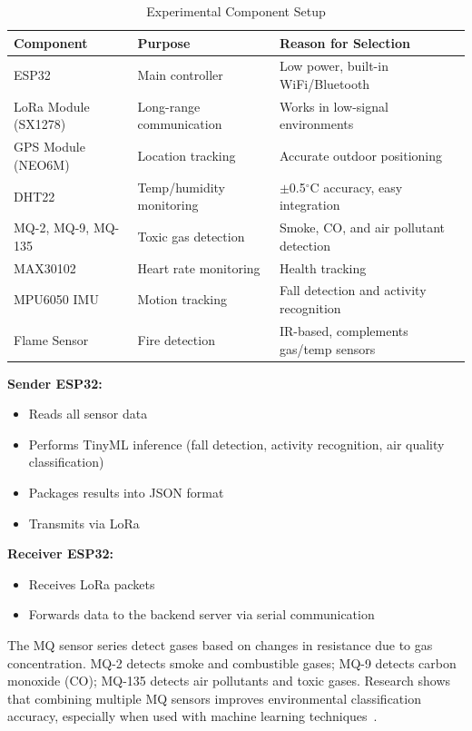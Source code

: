 \documentclass[conference]{IEEEtran}
\begin{document}
	\begin{table}[h]
		\caption{Experimental Component Setup}
		\label{tab:components}
		\centering
		\renewcommand{\arraystretch}{1.2}
		\begin{tabular}{|p{2.2cm}|p{2.4cm}|p{2.8cm}|}
			\hline
			\textbf{Component} & \textbf{Purpose} & \textbf{Reason for Selection} \\
			\hline
			ESP32 & Main controller & Low power, built-in WiFi/Bluetooth \\
			\hline
			LoRa Module (SX1278) & Long-range communication & Works in low-signal environments \\
			\hline
			GPS Module (NEO6M) & Location tracking & Accurate outdoor positioning \\
			\hline
			DHT22 & Temp/humidity monitoring & $\pm$0.5$^\circ$C accuracy, easy integration \\
			\hline
			MQ-2, MQ-9, MQ-135 & Toxic gas detection & Smoke, CO, and air pollutant detection \\
			\hline
			MAX30102 & Heart rate monitoring & Health tracking \\
			\hline
			MPU6050 IMU & Motion tracking & Fall detection and activity recognition \\
			\hline
			Flame Sensor & Fire detection & IR-based, complements gas/temp sensors \\
			\hline
		\end{tabular}
	\end{table}
	
	\noindent\textbf{Sender ESP32:}
	\begin{itemize}
		\item Reads all sensor data
		\item Performs TinyML inference (fall detection, activity recognition,
		air quality classification)
		\item Packages results into JSON format
		\item Transmits via LoRa
	\end{itemize}
	
	\noindent\textbf{Receiver ESP32:}
	\begin{itemize}
		\item Receives LoRa packets
		\item Forwards data to the backend server via serial communication
	\end{itemize}
	
	The MQ sensor series detect gases based on changes in resistance due to gas
	concentration. MQ-2 detects smoke and combustible gases; MQ-9 detects carbon
	monoxide (CO); MQ-135 detects air pollutants and toxic gases. Research shows
	that combining multiple MQ sensors improves environmental classification
	accuracy, especially when used with machine learning techniques~\cite{wang2024}.
	
\end{document}
